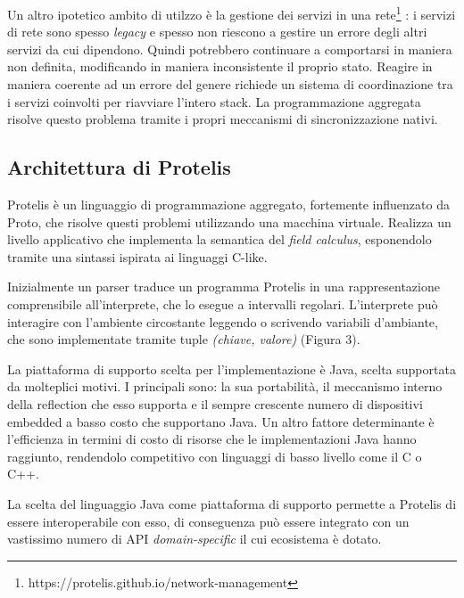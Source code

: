 Un altro ipotetico ambito di utilzzo è la gestione dei servizi in una
rete\footnote{https://protelis.github.io/network-management} \cite{Protelis}: i
servizi di rete sono spesso \textit{legacy} e spesso non riescono a gestire un
errore degli altri servizi da cui dipendono. Quindi potrebbero continuare a
comportarsi in maniera non definita, modificando in maniera inconsistente il
proprio stato. Reagire in maniera coerente ad un errore del genere richiede un
sistema di coordinazione tra i servizi coinvolti per riavviare l'intero
stack. La programmazione aggregata risolve questo problema tramite i propri
meccanismi di sincronizzazione nativi.






\subsection{Architettura di Protelis}
Protelis è un linguaggio di programmazione aggregato, fortemente influenzato da
Proto\cite{Proto}, che risolve questi problemi utilizzando una macchina
virtuale\cite{Protelis}. Realizza un livello applicativo che implementa la semantica del
\textit{field calculus}, esponendolo tramite una sintassi ispirata ai linguaggi
C-like.

Inizialmente un parser traduce un programma Protelis in
una rappresentazione comprensibile all'interprete, che lo esegue a intervalli
regolari. L'interprete può interagire con l'ambiente circostante leggendo o
scrivendo variabili d'ambiante, che sono implementate tramite tuple
\textit{(chiave, valore)} (Figura 3).

La piattaforma di supporto scelta per l'implementazione è Java, scelta
supportata da molteplici motivi\cite{Protelis}. I principali sono: la sua
portabilità, il meccanismo interno della reflection che esso supporta e il
sempre crescente numero di dispositivi embedded a basso costo che supportano
Java. Un altro fattore determinante è l'efficienza in termini di costo di
risorse che le implementazioni Java hanno raggiunto, rendendolo competitivo con
linguaggi di basso livello come il C o C++.

La scelta del linguaggio Java come piattaforma di supporto permette a Protelis
di essere interoperabile con esso, di conseguenza può essere integrato con un
vastissimo numero di API \textit{domain-specific} il cui ecosistema è dotato.
